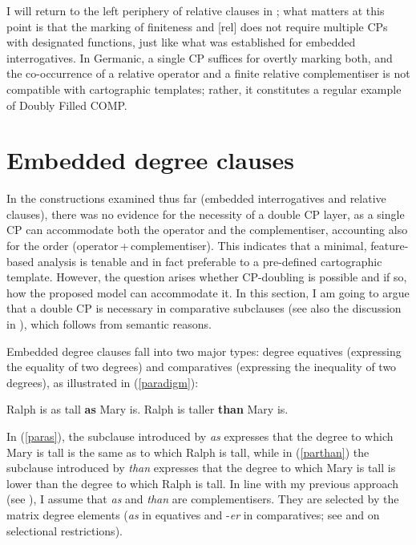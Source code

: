 I will return to the left periphery of relative clauses in ; what matters at this point is that the marking of finiteness and [rel] does not require multiple CPs with designated functions, just like what was established for embedded interrogatives. In Germanic, a single CP suffices for overtly marking both, and the co-occurrence of a relative operator and a finite relative complementiser is not compatible with cartographic templates; rather, it constitutes a regular example of Doubly Filled COMP.

\section{Embedded degree clauses} \label{sec:2degree}
In the constructions examined thus far (embedded interrogatives and relative clauses), there was no evidence for the necessity of a double CP layer, as a single CP can accommodate both the operator and the complementiser, accounting also for the order (operator\,+\,complementiser). This indicates that a minimal, feature-based analysis is tenable and in fact preferable to a pre-defined cartographic template. However, the question arises whether CP-doubling is possible and if so, how the proposed model can accommodate it. In this section, I am going to argue that a double CP is necessary in comparative subclauses (see also the discussion in ), which follows from semantic reasons.

Embedded degree clauses fall into two major types: degree equatives (expressing the equality of two degrees) and comparatives (expressing the inequality of two degrees), as illustrated in (\ref{paradigm}):

\ea \label{paradigm}
\ea Ralph is as tall \textbf{as} Mary is. \label{paras}
\ex Ralph is taller \textbf{than} Mary is. \label{parthan}
\z 
\z

In (\ref{paras}), the subclause introduced by \textit{as} expresses that the degree to which Mary is tall is the same as to which Ralph is tall, while in (\ref{parthan}) the subclause introduced by \textit{than} expresses that the degree to which Mary is tall is lower than the degree to which Ralph is tall. In line with my previous approach (see \citealt{bacskaiatkari2014diss}), I assume that \textit{as} and \textit{than} are complementisers. They are selected by the matrix degree elements (\textit{as} in equatives and -\textit{er} in comparatives; see \citealt[22--23]{lechner2004} and \citealt[45--53]{bacskaiatkari2014diss} on selectional restrictions).

